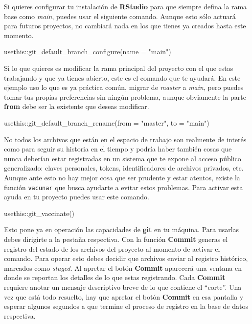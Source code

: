 \documentclass[
  spanish,
  letterpaper,
  DIV=11,
  numbers=noendperiod]{scrartcl}
\newenvironment{Shaded}{\begin{snugshade}}{\end{snugshade}}
\newcommand{\AttributeTok}[1]{\textcolor[rgb]{0.40,0.45,0.13}{#1}}
\newcommand{\FunctionTok}[1]{\textcolor[rgb]{0.28,0.35,0.67}{#1}}
\newcommand{\NormalTok}[1]{\textcolor[rgb]{0.00,0.23,0.31}{#1}}
\newcommand{\SpecialCharTok}[1]{\textcolor[rgb]{0.37,0.37,0.37}{#1}}
\newcommand{\StringTok}[1]{\textcolor[rgb]{0.13,0.47,0.30}{#1}}
\begin{document}
\begin{tcolorbox}
Si quieres configurar tu instalación de \textbf{RStudio} para que
siempre defina la rama base como \emph{main}, puedes usar el siguiente
comando. Aunque esto sólo actuará para futuros proyectos, no cambiará
nada en los que tienes ya creados hasta este momento.

\begin{Shaded}
\begin{Highlighting}[]
\NormalTok{usethis}\SpecialCharTok{::}\FunctionTok{git\_default\_branch\_configure}\NormalTok{(}\AttributeTok{name =} \StringTok{"main"}\NormalTok{)}
\end{Highlighting}
\end{Shaded}

Si lo que quieres es modificar la rama principal del proyecto con el que
estas trabajando y que ya tienes abierto, este es el comando que te
ayudará. En este ejemplo uso lo que es ya práctica común, migrar de
\emph{master} a \emph{main}, pero puedes tomar tus propias preferencias
sin ningún problema, aunque obviamente la parte \textbf{from} debe ser
la existente que deseas modificar.

\begin{Shaded}
\begin{Highlighting}[]
\NormalTok{usethis}\SpecialCharTok{::}\FunctionTok{git\_default\_branch\_rename}\NormalTok{(}\AttributeTok{from =} \StringTok{"master"}\NormalTok{, }\AttributeTok{to =} \StringTok{"main"}\NormalTok{)}
\end{Highlighting}
\end{Shaded}

No todos los archivos que están en el espacio de trabajo son realmente
de interés como para seguir su historia en el tiempo y podría haber
también cosas que nunca deberían estar registradas en un sistema que te
expone al acceso público generalizado: claves personales, tokens,
identificadores de archivos privados, etc. Aunque ante esto no hay mejor
cosa que ser prudente y estar atentos, existe la función
\texttt{vacunar} que busca ayudarte a evitar estos problemas. Para
activar esta ayuda en tu proyecto puedes usar este comando.

\begin{Shaded}
\begin{Highlighting}[]
\NormalTok{usethis}\SpecialCharTok{::}\FunctionTok{git\_vaccinate}\NormalTok{()}
\end{Highlighting}
\end{Shaded}

Esto pone ya en operación las capacidades de \textbf{git} en tu máquina.
Para usarlas debes dirigirte a la pestaña respectiva. Con la función
\textbf{Commit} generas el registro del estado de los archivos del
proyecto al momento de activar el comando. Para operar esto debes
decidir que archivos enviar al registro histórico, marcados como
\emph{staged}. Al apretar el botón \textbf{Commit} aparecerá una ventana
en donde se reportan los detalles de lo que estas registrando. Cada
\textbf{Commit} requiere anotar un mensaje descriptivo breve de lo que
contiene el ``corte''. Una vez que está todo resuelto, hay que apretar
el botón \textbf{Commit} en esa pantalla y esperar algunos segundos a
que termine el proceso de registro en la base de datos respectiva.


\end{tcolorbox}
\end{document}
